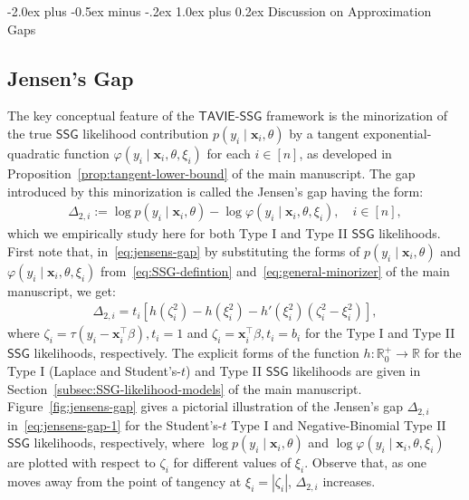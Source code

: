 \documentclass[12pt]{article}
\makeatletter
\def\section{\@startsection{section}{1}{\z@}
  {-2.0ex plus -0.5ex minus -.2ex} %
  {1.0ex plus 0.2ex}               %
  {\normalfont\Large\bfseries}}
\numberwithin{equation}{section}
\newcommand{\ssg}{\mathsf{SSG}}
\newcommand{\tssg}{\mathsf{TAVIE}\text{-}\mathsf{SSG}}
\makeatother
\begin{document}
\newpage


\section{Discussion on Approximation Gaps}\label{sec:gap-discussion}

\subsection{Jensen's Gap}\label{subsec:jensen's-gap}
The key conceptual feature of the $\tssg$ framework is the minorization of the true $\ssg$ likelihood contribution $p(y_i\mid \mathbf{x}_i, \theta)$ by a tangent exponential-quadratic function $\varphi(y_i\mid \mathbf{x}_i, \theta, \xi_i)$ for each $i\in [n]$, as developed in Proposition~\ref{prop:tangent-lower-bound} of the main manuscript. The gap introduced by this minorization is called the Jensen's gap having the form:
\begin{align}
\label{eq:jensens-gap}
\Delta_{2, i} := \log p(y_{i}\mid \mathbf{x}_i, \theta) - \log \varphi(y_i \mid \mathbf{x}_i, \theta, \xi_i), \quad i \in [n],
\end{align}
which we empirically study here for both Type I and Type II $\ssg$ likelihoods. First note that, in~\eqref{eq:jensens-gap} by substituting the forms of $p(y_i\mid \mathbf x_i, \theta)$ and $\varphi(y_i\mid \mathbf x_i, \theta, \xi_i)$ from~\eqref{eq:SSG-defintion} and~\eqref{eq:general-minorizer} of the main manuscript, we get:
\begin{align}
\label{eq:jensens-gap-1}
\Delta_{2, i} = t_i[h(\zeta_i^2) - h(\xi_i^{2}) - h'(\xi_i^2)(\zeta_i^2 - \xi_i^2)],
\end{align}
where $\zeta_i = \tau(y_i - \mathbf{x}_i^{\top}\beta), t_i=1$ and $\zeta_i = \mathbf{x}_i^{\top}\beta, t_i = b_i$ for the Type I and Type II $\ssg$ likelihoods, respectively. The explicit forms of the function $h: \mathbb{R}^{+}_{0} \to \mathbb{R}$ for the Type I (Laplace and Student's-$t$) and Type II $\ssg$ likelihoods are given in Section~\ref{subsec:SSG-likelihood-models} of the main manuscript. Figure~\ref{fig:jensens-gap} gives a pictorial illustration of the Jensen's gap $\Delta_{2, i}$ in~\eqref{eq:jensens-gap-1} for the Student's-$t$ Type I and Negative-Binomial Type II $\ssg$ likelihoods, respectively, where $\log p(y_{i}\mid \mathbf{x}_i, \theta)$ and $\log \varphi(y_i\mid \mathbf{x}_i, \theta, \xi_i)$ are plotted with respect to $\zeta_{i}$ for different values of $\xi_i$. Observe that, as one moves away from the point of tangency at $\xi_i = |\zeta_i|$, $\Delta_{2, i}$ increases.
\end{document}
